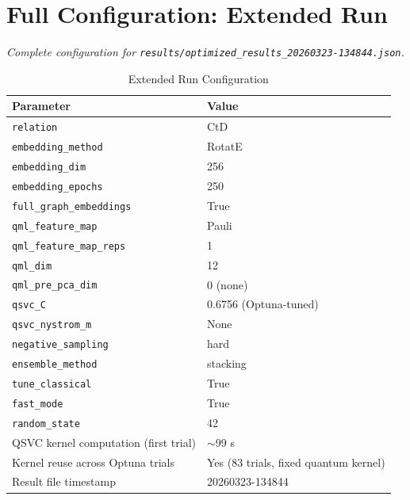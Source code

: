 \documentclass[twocolumn,10pt]{article}
\begin{document}
\section{Full Configuration: Extended Run}
\label{app:extended_config}

\textit{Complete configuration for \texttt{results/optimized\_results\_20260323-134844.json}.}

\begin{table}[t]
\centering
\caption{Extended Run Configuration}
\label{tab:config_extended}
\begin{tabular}{@{}ll@{}}
\toprule
\textbf{Parameter} & \textbf{Value} \\
\midrule
\texttt{relation} & CtD \\
\texttt{embedding\_method} & RotatE \\
\texttt{embedding\_dim} & 256 \\
\texttt{embedding\_epochs} & 250 \\
\texttt{full\_graph\_embeddings} & True \\
\texttt{qml\_feature\_map} & Pauli \\
\texttt{qml\_feature\_map\_reps} & 1 \\
\texttt{qml\_dim} & 12 \\
\texttt{qml\_pre\_pca\_dim} & 0 (none) \\
\texttt{qsvc\_C} & 0.6756 (Optuna-tuned) \\
\texttt{qsvc\_nystrom\_m} & None \\
\texttt{negative\_sampling} & hard \\
\texttt{ensemble\_method} & stacking \\
\texttt{tune\_classical} & True \\
\texttt{fast\_mode} & True \\
\texttt{random\_state} & 42 \\
QSVC kernel computation (first trial) & ${\sim}$99 s \\
Kernel reuse across Optuna trials & Yes (83 trials, fixed quantum kernel) \\
Result file timestamp & 20260323-134844 \\
\bottomrule
\end{tabular}
\end{table}
\end{document}
